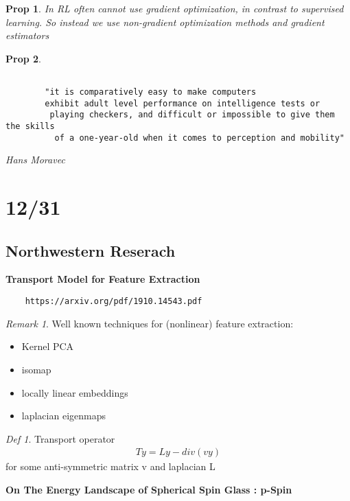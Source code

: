 \documentclass[11pt]{article}
\newtheorem{prop}{Prop}
\theoremstyle{remark}
\newtheorem{remark}{Remark}
\newtheorem{defi}{Def}
\begin{document}
\begin{prop}
	In RL often cannot use gradient optimization, in contrast to supervised learning. So instead we use non-gradient optimization methods and gradient estimators
\end{prop}

\begin{prop}

	\begin{verbatim}

		"it is comparatively easy to make computers 
		exhibit adult level performance on intelligence tests or
		 playing checkers, and difficult or impossible to give them the skills
		  of a one-year-old when it comes to perception and mobility"
	\end{verbatim}
	Hans Moravec
\end{prop}

\section{12/31}

\subsection{Northwestern Reserach}

\textbf{Transport Model for Feature Extraction}

\begin{verbatim}
	https://arxiv.org/pdf/1910.14543.pdf
\end{verbatim}

\begin{remark}
	Well known techniques for (nonlinear) feature extraction:
	\begin{itemize}
		\item Kernel PCA
		\item isomap
		\item locally linear embeddings
		\item laplacian eigenmaps
	\end{itemize}
\end{remark}

\begin{defi}
	Transport operator
	\begin{align*}
		Ty = Ly - div(vy)
	\end{align*}
	for some anti-symmetric matrix v and laplacian L
\end{defi}

\textbf{On The Energy Landscape of Spherical Spin Glass : p-Spin}
\end{document}
